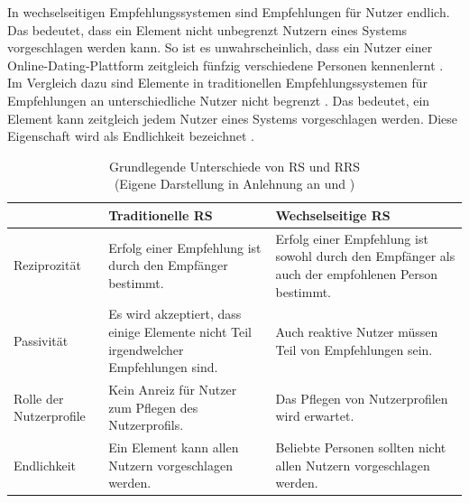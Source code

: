 In wechselseitigen Empfehlungssystemen sind Empfehlungen für Nutzer endlich.
Das bedeutet, dass ein Element nicht unbegrenzt Nutzern eines Systems vorgeschlagen werden kann.
So ist es unwahrscheinlich, dass ein Nutzer einer Online-Dating-Plattform zeitgleich fünfzig verschiedene Personen kennenlernt \cite[S. 35]{li:inproceedings}.
Im Vergleich dazu sind Elemente in traditionellen Empfehlungssystemen für Empfehlungen an unterschiedliche Nutzer nicht begrenzt \cite[S. 1468]{yildirim:article}.
Das bedeutet, ein Element kann zeitgleich jedem Nutzer eines Systems vorgeschlagen werden.
Diese Eigenschaft wird als Endlichkeit bezeichnet \cite[S. 35]{li:inproceedings}.

\begin{table}[htbp]
    \begin{center}
        \begin{tabular}{|p{}||p{}|p{}|}
            \hline
             & {\textbf{Traditionelle \ac{RS}}} & {\textbf{Wechselseitige \ac{RS}}} \\
            \hline
            \hline
            Reziprozität & Erfolg einer Empfehlung ist durch den Empfänger bestimmt. &  Erfolg einer Empfehlung ist sowohl durch den Empfänger als auch der empfohlenen Person bestimmt. \\
            \hline
            Passivität & Es wird akzeptiert, dass einige Elemente nicht Teil irgendwelcher Empfehlungen sind. &  Auch reaktive Nutzer müssen Teil von Empfehlungen sein. \\
            \hline
            Rolle der Nutzerprofile & Kein Anreiz für Nutzer zum Pflegen des Nutzerprofils. &  Das Pflegen von Nutzerprofilen wird erwartet. \\
            \hline
            Endlichkeit & Ein Element kann allen Nutzern vorgeschlagen werden. & Beliebte Personen sollten nicht allen Nutzern vorgeschlagen werden. \\
            \hline
    \end{tabular}
    \end{center}
    \caption[Grundlegende Unterschiede von \ac{RS} und \ac{RRS}]{Grundlegende Unterschiede von \ac{RS} und \ac{RRS} \\
	(Eigene Darstellung in Anlehnung an \cite[S. 546]{koprinska:inbook} und \cite[S. 35f.]{li:inproceedings})}
	\label{tab2}
\end{table}

